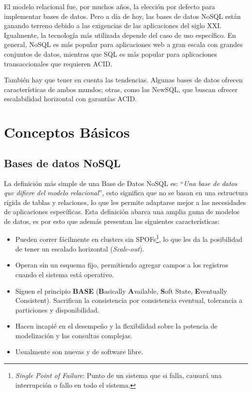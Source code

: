 \documentclass[pdflatex,sn-mathphys-num]{sn-jnl}
\theoremstyle{thmstyleone}%
\theoremstyle{thmstyletwo}%
\theoremstyle{thmstylethree}%
\begin{document}
\vspace{0.2cm}

El modelo relacional fue, por muchos años, la elección por defecto para implementar bases de datos. Pero a día de hoy, las bases de datos NoSQL están ganando terreno debido a las exigencias de las aplicaciones del siglo XXI. Igualmente, la tecnología más utilizada depende del caso de uso específico. En general, NoSQL es más popular para aplicaciones web a gran escala con grandes conjuntos de datos, mientras que SQL es más popular para aplicaciones transaccionales que requieren ACID.

También hay que tener en cuenta las tendencias. Algunas bases de datos ofrecen características de ambos mundos; otras, como las NewSQL, que buscan ofrecer escalabilidad horizontal con garantías ACID.

\section{Conceptos Básicos}\label{sec3}

\subsection{Bases de datos NoSQL}\label{sec31}

La definición más simple de una Base de Datos NoSQL es: ``\textit{Una base de datos que difiere del modelo relacional}''\cite{fund}, esto significa que no se basan en una estructura rígida de tablas y relaciones, lo que les permite adaptarse mejor a las necesidades de aplicaciones específicas. Esta definición abarca una amplia gama de modelos de datos, es por esto que además presentan las siguientes características:

\begin{itemize}
    \item Pueden correr fácilmente en clusters sin SPOFs\footnote{\textit{Single Point of Failure}: Punto de un sistema que si falla, causará una interrupción o fallo en todo el sistema.}, lo que les da la posibilidad de tener un escalado horizontal (\textit{Scale-out}).
    
    \item Operan sin un esquema fijo, permitiendo agregar campos a los registros cuando el sistema está operativo.
    
    \item Siguen el principio \textbf{BASE} (\textbf{B}asically \textbf{A}vailable, \textbf{S}oft State, \textbf{E}ventually Consistent). Sacrifican la consistencia por consistencia eventual, tolerancia a particiones y disponibilidad.
    
    \item Hacen incapié en el desempeño y la flexibilidad sobre la potencia de modelización y las consultas complejas.
    
    \item Usualmente son nuevas y de software libre.
\end{itemize}
\end{document}

